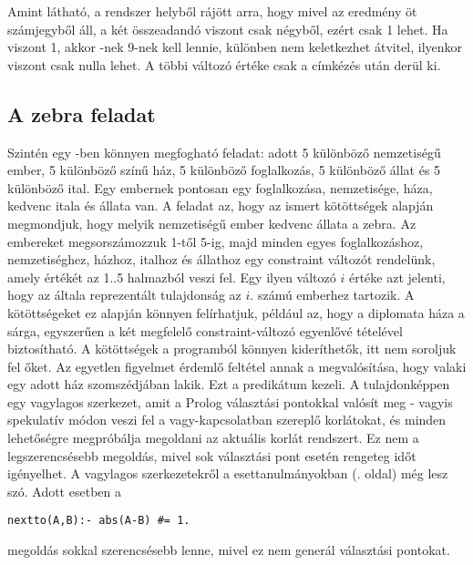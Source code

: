 Amint látható, a rendszer helyből rájött arra, hogy mivel az eredmény öt
számjegyből áll, a két összeadandó viszont csak négyből, ezért 
csak 1 lehet. Ha viszont  1, akkor -nek 9-nek kell lennie,
különben nem keletkezhet átvitel, ilyenkor viszont  csak nulla lehet.
A többi változó értéke csak a címkézés után derül ki.

\subsection{A zebra feladat}
Szintén egy \Clpfd -ben könnyen megfogható feladat: adott 5 különböző
nemzetiségű ember, 5 különböző színű ház, 5 különböző foglalkozás, 5
különböző állat és 5 különböző ital. Egy embernek pontosan egy
foglalkozása, nemzetisége, háza, kedvenc itala és állata van. A
feladat az, hogy az ismert kötöttségek alapján megmondjuk, hogy melyik
nemzetiségű ember kedvenc állata a zebra. Az embereket megsorszámozzuk
1-től 5-ig, majd minden egyes foglalkozáshoz, nemzetiséghez, házhoz,
italhoz és állathoz egy constraint változót rendelünk, amely értékét
az 1..5 halmazból veszi fel. Egy ilyen változó $i$ értéke azt jelenti,
hogy az általa reprezentált tulajdonság az $i$. számú emberhez
tartozik. A kötöttségeket ez alapján könnyen felírhatjuk, például az,
hogy a diplomata háza a sárga, egyszerűen a két megfelelő
constraint-változó egyenlővé tételével biztosítható.  A kötöttségek a
programból könnyen kideríthetők, itt nem soroljuk fel őket. Az
egyetlen figyelmet érdemlő feltétel annak a megvalósítása, hogy
valaki egy adott ház szomszédjában lakik. Ezt a  predikátum
kezeli. A  tulajdonképpen egy vagylagos szerkezet, amit a
Prolog választási pontokkal valósít meg - vagyis spekulatív módon veszi fel a
vagy-kapcsolatban szereplő korlátokat, és minden lehetőségre
megpróbálja megoldani az aktuális korlát rendszert. Ez nem a legszerencsésebb
megoldás, mivel sok választási pont esetén rengeteg időt igényelhet. A
vagylagos szerkezetekről a \clpfd esettanulmányokban (\pageref{diszjunkcio}.
oldal) még lesz szó. Adott esetben a 

\begin{verbatim}
nextto(A,B):- abs(A-B) #= 1.
\end{verbatim}

megoldás sokkal szerencsésebb lenne, mivel ez nem generál választási
pontokat.

